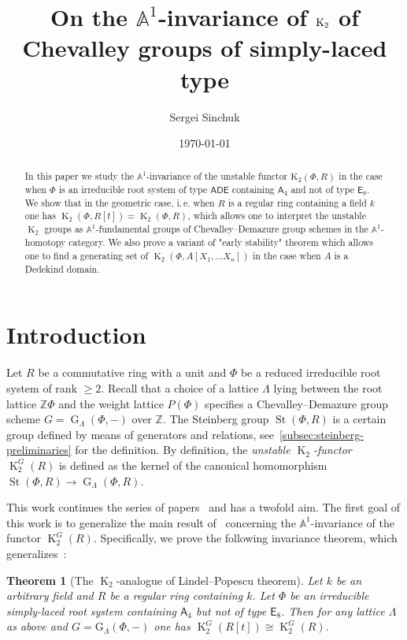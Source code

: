 \documentclass[oneside, 10pt]{amsart}
\title{On the $\mathbb{A}^1$-invariance of $\K_2$ of Chevalley groups of simply-laced type}
\author {Sergei Sinchuk}
\date {\today}
\DeclareMathOperator{\St}{St}
\DeclareMathOperator{\G}{G}
\DeclareMathOperator{\K}{K}
\newcommand{\rA}{\mathsf{A}}
\newcommand{\rE}{\mathsf{E}}
\newcommand{\ZZ}{\mathbb{Z}}
\newtheorem{thm}{Theorem}
\numberwithin{equation}{section}
\numberwithin{thm}{section}
\numberwithin{lemma}{section}
\theoremstyle{definition}
\theoremstyle{remark}
\begin{document}
\maketitle

\begin{abstract}
In this paper we study the $\mathbb{A}^1$-invariance of the unstable functor $\mathrm{K}_2(\Phi, R)$
in the case when $\Phi$ is an irreducible root system of type $\mathsf{ADE}$ containing $\rA_4$ and not of type $\rE_8$.
We show that in the geometric case, i.\,e. when $R$ is a regular ring containing a field $k$
one has $\K_2(\Phi, R[t]) = \K_2(\Phi, R)$, which allows one to interpret the unstable $\K_2$ groups
as $\mathbb{A}^1$-fundamental groups of Chevalley--Demazure group schemes in the $\mathbb{A}^1$-homotopy category.
We also prove a variant of "early stability" theorem which allows one to find a generating set
of $\K_2(\Phi, A[X_1, \ldots X_n])$ in the case when $A$ is a Dedekind domain.
\end{abstract}

\section{Introduction}\label{sec:introduction}

Let $R$ be a commutative ring with a unit and $\Phi$ be a reduced irreducible root system of rank $\geq 2$.
Recall that a choice of a lattice $\Lambda$ lying between the root lattice $\mathbb{Z}\Phi$ and the weight lattice $P(\Phi)$
specifies a Chevalley--Demazure group scheme $G=\G_\Lambda(\Phi, -)$ over $\ZZ$.
The Steinberg group $\St(\Phi, R)$ is a certain group defined by means of generators and relations, see~\cref{subsec:steinberg-preliminaries} for the definition.
By definition, the \textit{unstable $\K_2$-functor} $\K_2^G(R)$ is defined as the kernel of the canonical homomorphism $\St(\Phi, R) \to \G_\Lambda(\Phi, R)$.

This work continues the series of papers~\cite{LS20, LSV2} and has a twofold aim.
The first goal of this work is to generalize the main result of~\cite{LSV2} concerning the $\mathbb{A}^1$-invariance of the functor $\K_2^G(R)$.
Specifically, we prove the following invariance theorem, which generalizes~\cite[Theorem~1.1]{LSV2}:

\begin{thm}[The $\K_2$-analogue of Lindel--Popescu theorem] \label{thm:LP-for-K2}
Let $k$ be an arbitrary field and $R$ be a regular ring containing $k$.
Let $\Phi$ be an irreducible simply-laced root system containing $\rA_4$ but not of type $\rE_8$.
Then for any lattice $\Lambda$ as above and $G = \mathrm{G}_\Lambda(\Phi, -)$ one has
$\K_2^G(R[t])\cong\K_2^G(R).$
\end{thm}
\end{document}
